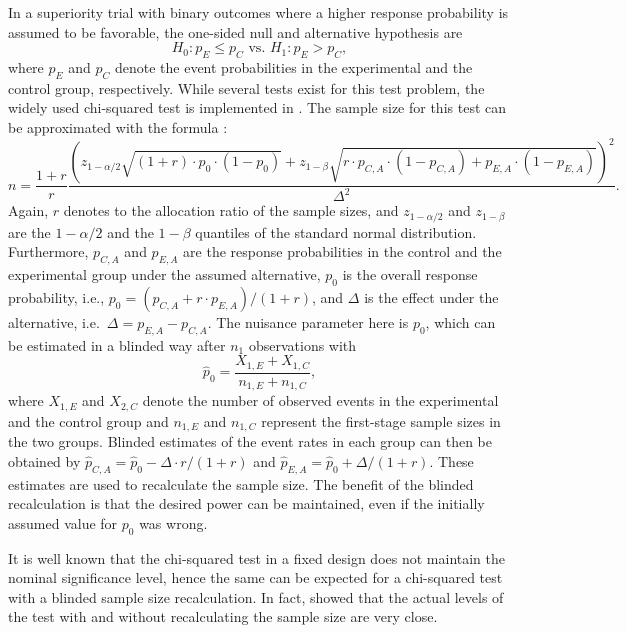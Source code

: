 In a superiority trial with binary outcomes where a higher response
probability is assumed to be favorable, the one-sided null and
alternative hypothesis are
\[H_0: p_E \leq p_C \text{ vs. } H_1: p_E > p_C,\] where \(p_E\) and
\(p_C\) denote the event probabilities in the experimental and the
control group, respectively. While several tests exist for this test
problem, the widely used chi-squared test is implemented in
. The sample size for this test can be approximated
with the formula \citep{Kieser2020}:
\[n = \frac{1 + r}{r} \frac{\left(z_{1 - \alpha / 2} 
\sqrt{\left(1 + r\right) \cdot p_0 \cdot \left(1 - p_0\right)} + z_{1 - \beta} 
\sqrt{r \cdot p_{C,A} \cdot \left(1 - p_{C,A}\right) + 
p_{E,A} \cdot \left(1 - p_{E,A}\right)}\right)^2}
{\Delta^2}.\] Again, \(r\) denotes to the allocation ratio of the sample
sizes, and \(z_{1 - \alpha / 2}\) and \(z_{1 - \beta}\) are the
\(1 - \alpha / 2\) and the \(1 - \beta\) quantiles of the standard
normal distribution. Furthermore, \(p_{C,A}\) and \(p_{E,A}\) are the
response probabilities in the control and the experimental group under
the assumed alternative, \(p_0\) is the overall response probability,
i.e., \(p_0 = \left(p_{C,A} + r \cdot p_{E,A}\right) / \left(1 + r\right)\), and \(\Delta\) is
the effect under the alternative, i.e.~\(\Delta = p_{E,A} - p_{C,A}\).
The nuisance parameter here is \(p_0\), which can be estimated in a
blinded way after \(n_1\) observations with
\[\hat{p}_0 = \frac{X_{1,E} + X_{1,C}}{n_{1,E} + n_{1,C}},\] where
\(X_{1,E}\) and \(X_{2,C}\) denote the number of observed events in the
experimental and the control group and \(n_{1,E}\) and \(n_{1,C}\)
represent the first-stage sample sizes in the two groups. Blinded
estimates of the event rates in each group can then be obtained by
\(\hat{p}_{C,A} = \hat{p}_0 - \Delta \cdot r / \left( 1 + r \right)\) and
\(\hat{p}_{E,A} = \hat{p}_0 + \Delta / \left(1 + r\right)\). These estimates are
used to recalculate the sample size. The benefit of the blinded
recalculation is that the desired power can be maintained, even if the
initially assumed value for \(p_0\) was wrong.

It is well known that the chi-squared test in a fixed design does not
maintain the nominal significance level, hence the same can be expected
for a chi-squared test with a blinded sample size recalculation. In
fact, \citet{FK2004} showed that the actual levels of the test with and
without recalculating the sample size are very close.

